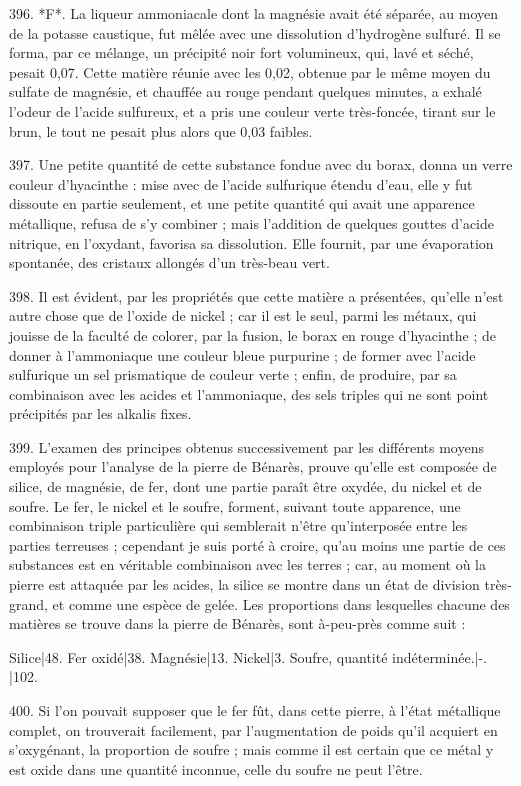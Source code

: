 \documentclass[a4paper, 11pt, oneside, polutonikogreek, french]{article}
\begin{document}
396. *F*. La liqueur ammoniacale dont la magnésie avait été séparée, au moyen de la potasse caustique, fut mêlée avec une dissolution d'hydrogène sulfuré. Il se forma, par ce mélange, un précipité noir fort volumineux, qui, lavé et séché, pesait 0,07. Cette matière réunie avec les 0,02, obtenue par le même moyen du sulfate de magnésie, et chauffée au rouge pendant quelques minutes, a exhalé l'odeur de l'acide sulfureux, et a pris une couleur verte très-foncée, tirant sur le brun, le tout ne pesait plus alors que 0,03 faibles.

397. Une petite quantité de cette substance fondue avec du borax, donna un verre couleur d'hyacinthe : mise avec de l'acide sulfurique étendu d'eau, elle y fut dissoute en partie seulement, et une petite quantité qui avait une apparence métallique, refusa de s'y combiner ; mais l'addition de quelques gouttes d'acide nitrique, en l'oxydant, favorisa sa dissolution. Elle fournit, par une évaporation spontanée, des cristaux allongés d'un très-beau vert.

398. Il est évident, par les propriétés que cette matière a présentées, qu'elle n'est autre chose que de l'oxide de nickel ; car il est le seul, parmi les métaux, qui jouisse de la faculté de colorer, par la fusion, le borax en rouge d'hyacinthe ; de donner à l'ammoniaque une couleur bleue purpurine ; de former avec l'acide sulfurique un sel prismatique de couleur verte ; enfin, de produire, par sa combinaison avec les acides et l'ammoniaque, des sels triples qui ne sont point précipités par les alkalis fixes.

399. L'examen des principes obtenus successivement par les différents moyens employés pour l'analyse de la pierre de Bénarès, prouve qu'elle est composée de silice, de magnésie, de fer, dont une partie paraît être oxydée, du nickel et de soufre. Le fer, le nickel et le soufre, forment, suivant toute apparence, une combinaison triple particulière qui semblerait n'être qu'interposée entre les parties terreuses ; cependant je suis porté à croire, qu'au moins une partie de ces substances est en véritable combinaison avec les terres ; car, au moment où la pierre est attaquée par les acides, la silice se montre dans un état de division très-grand, et comme une espèce de gelée. Les proportions dans lesquelles chacune des matières se trouve dans la pierre de Bénarès, sont à-peu-près comme suit :

Silice|48.
Fer oxidé|38.
Magnésie|13.
Nickel|3.
Soufre, quantité indéterminée.|-.
|102.

400. Si l'on pouvait supposer que le fer fût, dans cette pierre, à l'état métallique complet, on trouverait facilement, par l'augmentation de poids qu'il acquiert en s'oxygénant, la proportion de soufre ; mais comme il est certain que ce métal y est oxide dans une quantité inconnue, celle du soufre ne peut l'être.
\end{document}
